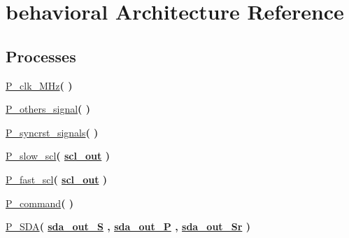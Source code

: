 \hypertarget{classtb___s___p___sr_1_1behavioral}{}\section{behavioral Architecture Reference}
\label{classtb___s___p___sr_1_1behavioral}
\subsection*{Processes}
 \begin{DoxyCompactItemize}
\item 
\hyperlink{classtb___s___p___sr_1_1behavioral_a4b6940703ffe261d728114b7c6c439e8}{P\+\_\+clk\+\_\+M\+Hz}{\bfseries  (  )}
\item 
\hyperlink{classtb___s___p___sr_1_1behavioral_ad9352d7195a550389abc45f562eae289}{P\+\_\+others\+\_\+signal}{\bfseries  (  )}
\item 
\hyperlink{classtb___s___p___sr_1_1behavioral_a5db205d3a8eaa6843c25e75308a3ad44}{P\+\_\+syncrst\+\_\+signals}{\bfseries  (  )}
\item 
\hyperlink{classtb___s___p___sr_1_1behavioral_a604353fd55bad277047edd8d997126c1}{P\+\_\+slow\+\_\+scl}{\bfseries  ( {\bfseries {\bfseries \hyperlink{classtb___s___p___sr_1_1behavioral_a30234227a8ae73dda5f4181fa05043ed}{scl\+\_\+out}} \textcolor{vhdlchar}{ }} )}
\item 
\hyperlink{classtb___s___p___sr_1_1behavioral_a39912d980eb609d27877afa8f7e7e1f2}{P\+\_\+fast\+\_\+scl}{\bfseries  ( {\bfseries {\bfseries \hyperlink{classtb___s___p___sr_1_1behavioral_a30234227a8ae73dda5f4181fa05043ed}{scl\+\_\+out}} \textcolor{vhdlchar}{ }} )}
\item 
\hyperlink{classtb___s___p___sr_1_1behavioral_a5e2498b01d0a28e123f30b5d92e44447}{P\+\_\+command}{\bfseries  (  )}
\item 
\hyperlink{classtb___s___p___sr_1_1behavioral_aa9fdf0ff9185eb362bd480fc1d62f1e1}{P\+\_\+\+S\+DA}{\bfseries  ( {\bfseries {\bfseries \hyperlink{classtb___s___p___sr_1_1behavioral_a051bd790d4ac3e218768535af81a3b00}{sda\+\_\+out\+\_\+S}} \textcolor{vhdlchar}{ }} , {\bfseries {\bfseries \hyperlink{classtb___s___p___sr_1_1behavioral_ab30cd8215588e5e70fda5ebeda888f94}{sda\+\_\+out\+\_\+P}} \textcolor{vhdlchar}{ }} , {\bfseries {\bfseries \hyperlink{classtb___s___p___sr_1_1behavioral_a0bfb74db8c40311a304a886f63009859}{sda\+\_\+out\+\_\+\+Sr}} \textcolor{vhdlchar}{ }} )}
\end{DoxyCompactItemize}
